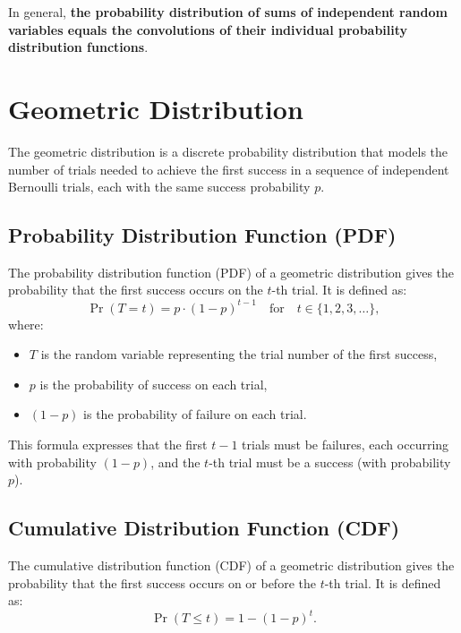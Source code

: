 \documentclass{masterthesis}
\begin{document}
In general, \textbf{the probability distribution of sums of independent random variables equals the convolutions of their individual probability distribution functions}.

\section{Geometric Distribution}\label{section:geometric_distribution}

The geometric distribution is a discrete probability distribution that models the number of trials needed to achieve the first success in a sequence of independent Bernoulli trials, each with the same success probability $p$.

\subsection{Probability Distribution Function (PDF)}\label{subsection:geometric_pdf}

The probability distribution function (PDF) of a geometric distribution gives the probability that the first success occurs on the $t$-th trial. It is defined as:
\begin{equation}
    \Pr(T = t) = p \cdot (1 - p)^{t-1} \quad \text{for} \quad t \in \{1, 2, 3, \ldots \},
\end{equation}
where:
\begin{itemize}
    \item $T$ is the random variable representing the trial number of the first success,
    \item $p$ is the probability of success on each trial,
    \item $(1 - p)$ is the probability of failure on each trial.
\end{itemize}

This formula expresses that the first $t-1$ trials must be failures, each occurring with probability $(1-p)$, and the $t$-th trial must be a success (with probability $p$).

\subsection{Cumulative Distribution Function (CDF)}\label{subsection:geometric_cdf}

The cumulative distribution function (CDF) of a geometric distribution gives the probability that the first success occurs on or before the $t$-th trial. It is defined as:
\begin{equation}
    \Pr(T \leq t) = 1 - (1 - p)^t.
\end{equation}
\end{document}
